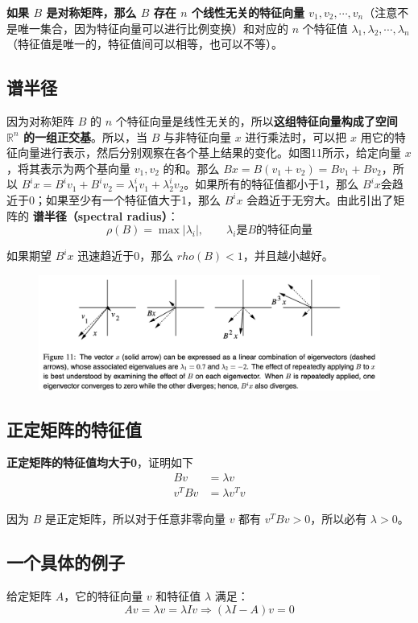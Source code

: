 \documentclass[12pt]{article}
\begin{document}
\textbf{如果 $B$ 是对称矩阵，那么 $B$ 存在 $n$ 个线性无关的特征向量 $v_1, v_2, \cdots, v_n$}（注意不是唯一集合，因为特征向量可以进行比例变换）和对应的 $n$ 个特征值 $\lambda_1, \lambda_2, \cdots, \lambda_n$（特征值是唯一的，特征值间可以相等，也可以不等）。
 
\subsection{谱半径}
因为对称矩阵 $B$ 的 $n$ 个特征向量是线性无关的，所以\textbf{这组特征向量构成了空间 $\mathbb{R}^n$ 的一组正交基}。所以，当 $B$ 与非特征向量 $x$ 进行乘法时，可以把 $x$ 用它的特征向量进行表示，然后分别观察在各个基上结果的变化。如图11所示，给定向量 $x$，将其表示为两个基向量 $v_1, v_2$ 的和。那么 $Bx = B(v_1 + v_2) = Bv_1 + Bv_2$，所以 $B^ix = B^iv_1 + B^iv_2 = \lambda^i_1 v_1 + \lambda^i_2 v_2$。如果所有的特征值都小于1，那么 $B^ix$会趋近于0；如果至少有一个特征值大于1，那么 $B^ix$ 会趋近于无穷大。由此引出了矩阵的 \textbf{谱半径（spectral radius）}：
 $$
 \rho (B) = \max|\lambda_i|, \qquad \lambda_i\text{是} B \text{的特征向量}
 $$
 
 如果期望 $B^ix$ 迅速趋近于0，那么 $rho(B) < 1$，并且越小越好。
 \begin{figure}[H]
    \centering
    \includegraphics[width=1\textwidth]{fig/CG_Plot_Eightvalue_3.png}
\end{figure}

 \subsection{正定矩阵的特征值}
 \textbf{正定矩阵的特征值均大于0}，证明如下
\begin{align*}
Bv &= \lambda v \\
v^T B v &= \lambda v^T v
\end{align*}

因为 $B$ 是正定矩阵，所以对于任意非零向量 $v$ 都有 $v^T B v > 0$，所以必有 $\lambda > 0$。
 
\subsection{一个具体的例子}
给定矩阵 $A$，它的特征向量 $v$ 和特征值 $\lambda$ 满足：
$$
Av = \lambda v = \lambda Iv \Rightarrow (\lambda I - A) v = 0
$$
\end{document}
